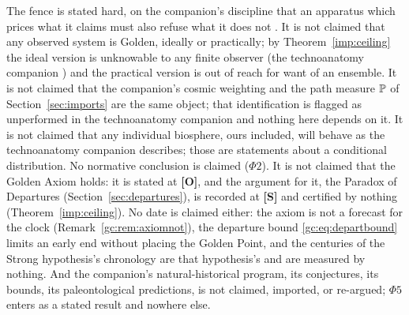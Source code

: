 The fence is stated hard, on the companion's discipline that an
apparatus which prices what it claims must also refuse what it does not
\cite{AethusOptimalEarth}. It is not claimed that any observed system is Golden, ideally or
practically; by Theorem~\ref{imp:ceiling} the ideal version is
unknowable to any finite observer (the technoanatomy companion \cite{GoldenTechnoanatomy}) and
the practical version is out of reach for want of an ensemble. It is not claimed that the companion's cosmic
weighting and the path measure $\mathbb{P}$ of
Section~\ref{sec:imports} are the same object; that
identification is flagged as unperformed in
the technoanatomy companion \cite{GoldenTechnoanatomy} and nothing here depends on it. It is not
claimed that any individual biosphere, ours included, will behave as
the technoanatomy companion \cite{GoldenTechnoanatomy} describes; those are statements about a
conditional distribution. No normative conclusion is claimed
($\Phi2$). It is not claimed that the Golden Axiom holds: it is stated at
\textbf{[O]}, and the argument for it, the Paradox of Departures
(Section~\ref{sec:departures}), is recorded at \textbf{[S]} and certified
by nothing (Theorem~\ref{imp:ceiling}). No date is claimed either: the axiom is not a forecast for the clock (Remark~\ref{gc:rem:axiomnot}), the departure bound \eqref{gc:eq:departbound} limits an early end without placing the Golden Point, and the centuries of the Strong hypothesis's chronology are that hypothesis's and are measured by nothing. And the companion's natural-historical program, its
conjectures, its bounds, its paleontological predictions, is not
claimed, imported, or re-argued; $\Phi5$ enters as a stated result and
nowhere else.

